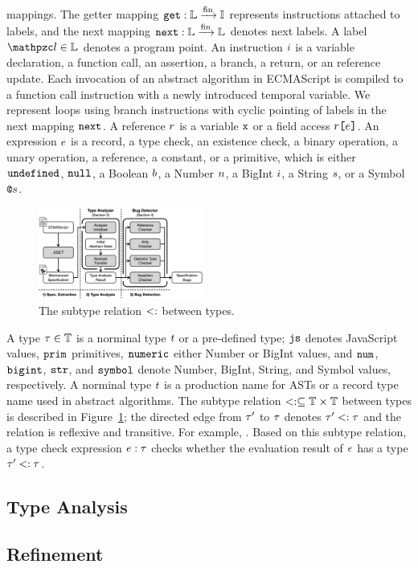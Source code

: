 mappings. The getter mapping $\texttt{get}: \mathbb{L} \xrightarrow{\text{fin}} \mathbb{I}$ represents
instructions attached to labels, and the next mapping $\texttt{next}: \mathbb{L} \xrightarrow{\text{fin}}
\mathbb{L}$ denotes next labels. A label $\lab \in \labset$ denotes a program
point.  An instruction $i$ is a variable declaration, a function call, an
assertion, a branch, a return, or an reference update.  Each invocation of an
abstract algorithm in ECMAScript is compiled to a function call instruction with
a newly introduced temporal variable.  We represent loops using branch
instructions with cyclic pointing of labels in the next mapping $\texttt{next}$.  A
reference $r$ is a variable $\texttt{x}$ or a field access $r \texttt{[} e
\texttt{]}$.  An expression $e$ is a record, a type check, an existence check, a
binary operation, a unary operation, a reference, a constant, or a primitive,
which is either $\texttt{undefined}$, $\texttt{null}$, a Boolean $b$, a Number $n$, a
BigInt $i$, a String $s$, or a Symbol $\texttt{@}s$.

\begin{figure}
  \centering
  \includegraphics[width=0.48\textwidth]{img/overall}
  \vspace*{-1.5em}
  \caption{The subtype relation $<:$ between types.}
  \label{fig:subtype}
  \vspace*{-1.5em}
\end{figure}

A type $\tau \in \mathbb{T}$ is a norminal type $t$ or a pre-defined type;
$\texttt{js}$ denotes JavaScript values, $\texttt{prim}$ primitives, $\texttt{numeric}$ either Number
or BigInt values, and $\texttt{num}$, $\texttt{bigint}$, $\texttt{str}$, and $\texttt{symbol}$ denote Number,
BigInt, String, and Symbol values, respectively.  A norminal type $t$ is a
production name for ASTs or a record type name used in abstract algorithms.  The
subtype relation $<: \subseteq \mathbb{T} \times \mathbb{T}$ between types is
described in Figure~\ref{fig:subtype}; the directed edge from $\tau'$ to $\tau$
denotes $\tau' <: \tau$ and the relation is reflexive and transitive.  For
example, .  Based on
this subtype relation, a type check expression $e: \tau$ checks whether the
evaluation result of $e$ has a type $\tau' <: \tau$.  


\subsection{Type Analysis}\label{sec:analysis}

\subsection{Refinement}\label{sec:refine}

